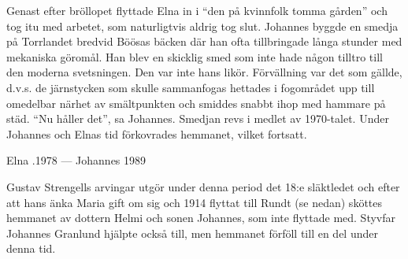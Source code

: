 Genast efter bröllopet flyttade Elna  in i ``den på kvinnfolk tomma gården'' och tog itu med arbetet, som naturligtvis aldrig tog slut. Johannes byggde en smedja på Torrlandet bredvid Böösas bäcken där han ofta tillbringade långa stunder med mekaniska göromål. Han blev en skicklig smed som inte hade någon tilltro till  den moderna svetsningen. Den var inte hans likör. Förvällning var det som gällde, d.v.s. de järnstycken som skulle sammanfogas hettades i fogområdet upp till omedelbar närhet av smältpunkten och smiddes snabbt ihop med hammare på städ. ``Nu håller det'', sa Johannes. Smedjan revs i medlet av 1970-talet. Under Johannes och Elnas tid förkovrades hemmanet, vilket fortsatt.
\begin{jhchildren}
  \item {}
  \item {}
  \item {}
  \item {}
\end{jhchildren}

Elna .1978  ---  Johannes  1989


Gustav Strengells arvingar utgör under denna period det 18:e släktledet och efter att hans änka Maria gift om sig och 1914 flyttat till Rundt (se nedan) sköttes hemmanet av dottern Helmi och sonen Johannes, som inte flyttade med. Styvfar Johannes Granlund hjälpte också till, men hemmanet förföll till en del under denna tid.


